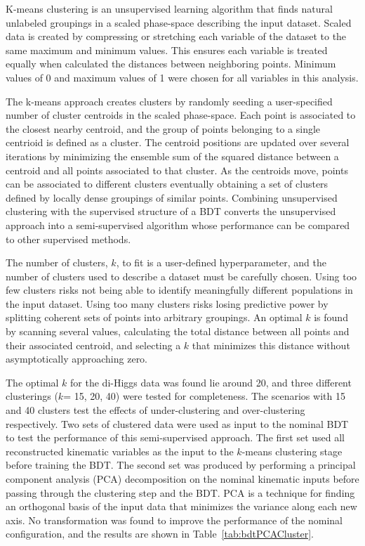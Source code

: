 \label{sec:kmeans}
K-means clustering is an unsupervised learning algorithm that finds natural unlabeled groupings in a scaled phase-space describing the input dataset. Scaled data is created by compressing or stretching each variable of the dataset to the same maximum and minimum values. This ensures each variable is treated equally when calculated the distances between neighboring points. Minimum values of 0 and maximum values of 1 were chosen for all variables in this analysis.

The k-means approach creates clusters by randomly seeding a user-specified number of cluster centroids in the scaled phase-space. Each point is associated to the closest nearby centroid, and the group of points belonging to a single centrioid is defined as a cluster. The centroid positions are updated over several iterations by minimizing the ensemble sum of the squared distance between a centroid and all points associated to that cluster. As the centroids move, points can be associated to different clusters eventually obtaining a set of clusters defined by locally dense groupings of similar points. Combining unsupervised clustering with the supervised structure of a BDT converts the unsupervised approach into a semi-supervised algorithm whose performance can be compared to other supervised methods.

The number of clusters, $k$, to fit is a user-defined hyperparameter, and the number of clusters used to describe a dataset must be carefully chosen. Using too few clusters risks not being able to identify meaningfully different populations in the input dataset. Using too many clusters risks losing predictive power by splitting coherent sets of points into arbitrary groupings. An optimal $k$ is found by scanning several values, calculating the total distance between all points and their associated centroid, and selecting a $k$ that minimizes this distance without asymptotically approaching zero.

The optimal $k$ for the di-Higgs data was found lie around 20, and three different clusterings ($k$= 15, 20, 40) were tested for completeness. The scenarios with 15 and 40 clusters test the effects of under-clustering and over-clustering respectively. Two sets of clustered data were used as input to the nominal BDT to test the performance of this semi-supervised approach. The first set used all reconstructed kinematic variables as the input to the $k$-means clustering stage before training the BDT. The second set was produced by performing a principal component analysis (PCA) decomposition on the nominal kinematic inputs before passing through the clustering step and the BDT. PCA is a technique for finding an orthogonal basis of the input data that minimizes the variance along each new axis. No transformation was found to improve the performance of the nominal configuration, and the results are shown in Table~\ref{tab:bdtPCACluster}.

